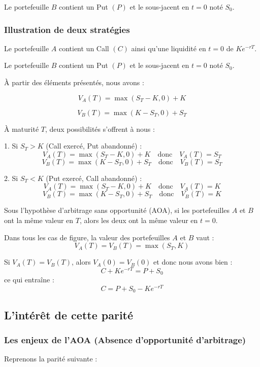 \documentclass[a4paper, 12pt]{report}
\begin{document}
Le portefeuille \( B \) contient un Put \( (P) \) et le sous-jacent en \( t = 0 \) noté \( S_0 \).

\subsubsection{Illustration de deux stratégies}

Le portefeuille \( A \) contient un Call \( (C) \) ainsi qu’une liquidité en \( t = 0 \) de \( K e^{-rT} \).

Le portefeuille \( B \) contient un Put \( (P) \) et le sous-jacent en \( t = 0 \) noté \( S_0 \).

À partir des éléments présentés, nous avons :

\[
V_A(T) = \max(S_T - K, 0) + K
\]

\[
V_B(T) = \max(K - S_T, 0) + S_T
\]

À maturité \( T \), deux possibilités s’offrent à nous :

1. Si \( S_T > K \) (Call exercé, Put abandonné) :
\[
V_A(T) = \max(S_T - K, 0) + K \quad \text{donc} \quad V_A(T) = S_T
\]
\[
V_B(T) = \max(K - S_T, 0) + S_T \quad \text{donc} \quad V_B(T) = S_T
\]

2. Si \( S_T < K \) (Put exercé, Call abandonné) :
\[
V_A(T) = \max(S_T - K, 0) + K \quad \text{donc} \quad V_A(T) = K
\]
\[
V_B(T) = \max(K - S_T, 0) + S_T \quad \text{donc} \quad V_B(T) = K
\]

Sous l'hypothèse d’arbitrage sans opportunité (AOA), si les portefeuilles \( A \) et \( B \) ont la même valeur en \( T \), alors les deux ont la même valeur en \( t = 0 \).

Dans tous les cas de figure, la valeur des portefeuilles \( A \) et \( B \) vaut :
\[
V_A(T) = V_B(T) = \max(S_T, K)
\]

Si \( V_A(T) = V_B(T) \), alors \( V_A(0) = V_B(0) \) et donc nous avons bien :
\[
C + K e^{-rT} = P + S_0
\]
ce qui entraîne :
\[
C = P + S_0 - K e^{-rT}
\]

\subsection{L’intérêt de cette parité}

\subsubsection{Les enjeux de l’AOA (Absence d'opportunité d'arbitrage)}

Reprenons la parité suivante :
\end{document}

